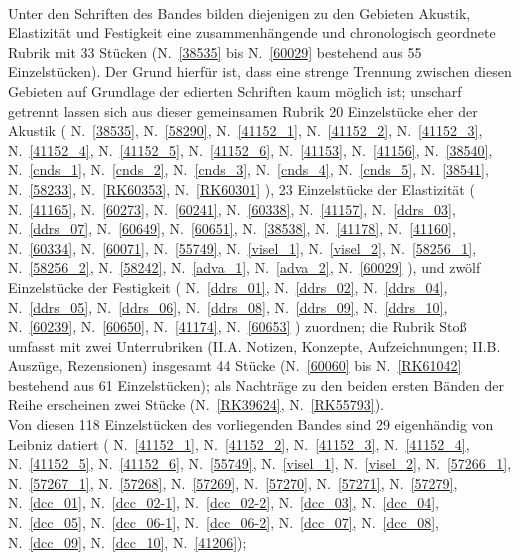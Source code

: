 \\ \indent 
Unter den Schriften des Bandes bilden diejenigen zu den Gebieten Akustik, Elastizität und Festigkeit eine zusammenhängende und chronologisch geordnete Rubrik mit 33 Stücken (N.~\ref{38535} bis N.~\ref{60029} bestehend aus 55 Einzelstücken). Der Grund hierfür ist, dass eine strenge Trennung zwischen diesen Gebieten auf Grundlage der edierten Schriften kaum möglich ist; unscharf getrennt lassen sich aus dieser gemeinsamen Rubrik 20 Einzelstücke eher der Akustik (%
N.~\ref{38535},
N.~\ref{58290},
N.~\ref{41152_1},
N.~\ref{41152_2},
N.~\ref{41152_3},
N.~\ref{41152_4},
N.~\ref{41152_5},
N.~\ref{41152_6},
N.~\ref{41153},
N.~\ref{41156},
N.~\ref{38540},
N.~\ref{cnds_1},
N.~\ref{cnds_2},
N.~\ref{cnds_3},
N.~\ref{cnds_4},
N.~\ref{cnds_5},
N.~\ref{38541},
N.~\ref{58233},
N.~\ref{RK60353},
N.~\ref{RK60301}%
),
23 Einzelstücke der Elastizität (%
N.~\ref{41165},
N.~\ref{60273},
N.~\ref{60241},
N.~\ref{60338},
N.~\ref{41157},
N.~\ref{ddrs_03},
N.~\ref{ddrs_07},
N.~\ref{60649},
N.~\ref{60651},
N.~\ref{38538},
N.~\ref{41178},
N.~\ref{41160},
N.~\ref{60334},
N.~\ref{60071},
N.~\ref{55749},
N.~\ref{visel_1},
N.~\ref{visel_2},
N.~\ref{58256_1},
N.~\ref{58256_2},
N.~\ref{58242},
N.~\ref{adva_1},
N.~\ref{adva_2},
N.~\ref{60029}%
),
und zwölf Einzelstücke der Festigkeit (%
N.~\ref{ddrs_01},
N.~\ref{ddrs_02},
N.~\ref{ddrs_04},
N.~\ref{ddrs_05},
N.~\ref{ddrs_06},
N.~\ref{ddrs_08},
N.~\ref{ddrs_09},
N.~\ref{ddrs_10},
N.~\ref{60239},
N.~\ref{60650},
N.~\ref{41174},
N.~\ref{60653}%
) zuordnen; die Rubrik Stoß umfasst mit zwei Unterrubriken (II.A. Notizen, Konzepte, Aufzeichnungen; II.B. Auszüge, Rezensionen) insgesamt 44 Stücke (N.~\ref{60060} bis N.~\ref{RK61042} bestehend aus 61 Einzelstücken); als Nachträge zu den beiden ersten Bänden der Reihe erscheinen zwei Stücke (N.~\ref{RK39624}, N.~\ref{RK55793}).
\\ \indent
Von diesen 118 Einzelstücken des vorliegenden Bandes sind 29 eigenhändig von Leibniz datiert (%
N.~\ref{41152_1},
N.~\ref{41152_2},
N.~\ref{41152_3},
N.~\ref{41152_4},
N.~\ref{41152_5},
N.~\ref{41152_6},
N.~\ref{55749},
N.~\ref{visel_1},
N.~\ref{visel_2},
N.~\ref{57266_1},
N.~\ref{57267_1},
N.~\ref{57268},
N.~\ref{57269},
N.~\ref{57270},
N.~\ref{57271},
N.~\ref{57279},
N.~\ref{dcc_01},
N.~\ref{dcc_02-1},
N.~\ref{dcc_02-2},
N.~\ref{dcc_03},
N.~\ref{dcc_04},
N.~\ref{dcc_05},
N.~\ref{dcc_06-1},
N.~\ref{dcc_06-2},
N.~\ref{dcc_07},
N.~\ref{dcc_08},
N.~\ref{dcc_09},
N.~\ref{dcc_10},
N.~\ref{41206});
